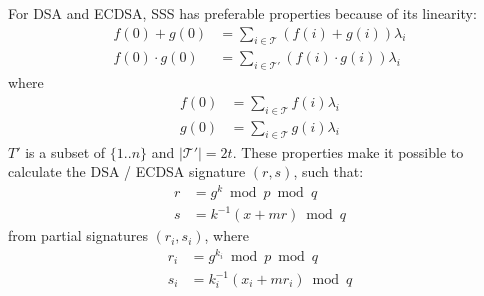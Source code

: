 For DSA and ECDSA, SSS has preferable properties because of its
linearity:
\begin{align*}
f(0) + g(0) &= \sum_{i \in \mathcal{T}} (f(i) + g(i)) \lambda_i \\
f(0) \cdot g(0) &= \sum_{i \in \mathcal{T'}} (f(i) \cdot g(i)) \lambda_i
\end{align*}
where
\begin{align*}
  f(0) &= \sum_{i \in \mathcal{T}} f(i) \lambda_i \\
  g(0) &= \sum_{i \in \mathcal{T}} g(i) \lambda_i
\end{align*}
$T'$ is a subset of $\{1..n\}$ and $|\mathcal{T'}| = 2t$. These
properties make it possible to calculate the DSA / ECDSA signature
$(r, s)$, such that:
\begin{align*}
  r &= g^k \bmod p \bmod q\\
  s &= k^{-1}(x + mr) \bmod q
\end{align*}
from partial signatures $(r_i, s_i)$, where
\begin{align*}
  r_i &= g^{k_i} \bmod p \bmod q\\
  s_i &= k_i^{-1}(x_i + mr_i) \bmod q
\end{align*}
